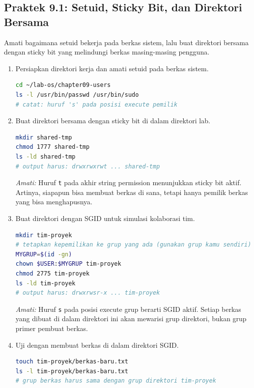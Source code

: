 \subsection*{Praktek 9.1: Setuid, Sticky Bit, dan Direktori Bersama}

Amati bagaimana setuid bekerja pada berkas sistem, lalu buat direktori bersama dengan sticky bit yang melindungi berkas masing-masing pengguna.

\begin{enumerate}
    \item Persiapkan direktori kerja dan amati setuid pada berkas sistem.
\begin{lstlisting}[language=bash, caption={Amati setuid pada berkas sistem}]
cd ~/lab-os/chapter09-users
ls -l /usr/bin/passwd /usr/bin/sudo
# catat: huruf 's' pada posisi execute pemilik
\end{lstlisting}

    \item Buat direktori bersama dengan sticky bit di dalam direktori lab.
\begin{lstlisting}[language=bash, caption={Direktori bersama dengan sticky bit}]
mkdir shared-tmp
chmod 1777 shared-tmp
ls -ld shared-tmp
# output harus: drwxrwxrwt ... shared-tmp
\end{lstlisting}

    \textit{Amati:} Huruf \texttt{t} pada akhir string permission menunjukkan sticky bit aktif. Artinya, siapapun bisa membuat berkas di sana, tetapi hanya pemilik berkas yang bisa menghapusnya.

    \item Buat direktori dengan SGID untuk simulasi kolaborasi tim.
\begin{lstlisting}[language=bash, caption={Direktori tim dengan SGID}]
mkdir tim-proyek
# tetapkan kepemilikan ke grup yang ada (gunakan grup kamu sendiri)
MYGRUP=$(id -gn)
chown $USER:$MYGRUP tim-proyek
chmod 2775 tim-proyek
ls -ld tim-proyek
# output harus: drwxrwsr-x ... tim-proyek
\end{lstlisting}

    \textit{Amati:} Huruf \texttt{s} pada posisi execute grup berarti SGID aktif. Setiap berkas yang dibuat di dalam direktori ini akan mewarisi grup direktori, bukan grup primer pembuat berkas.

    \item Uji dengan membuat berkas di dalam direktori SGID.
\begin{lstlisting}[language=bash, caption={Verifikasi pewarisan grup}]
touch tim-proyek/berkas-baru.txt
ls -l tim-proyek/berkas-baru.txt
# grup berkas harus sama dengan grup direktori tim-proyek
\end{lstlisting}
\end{enumerate}


